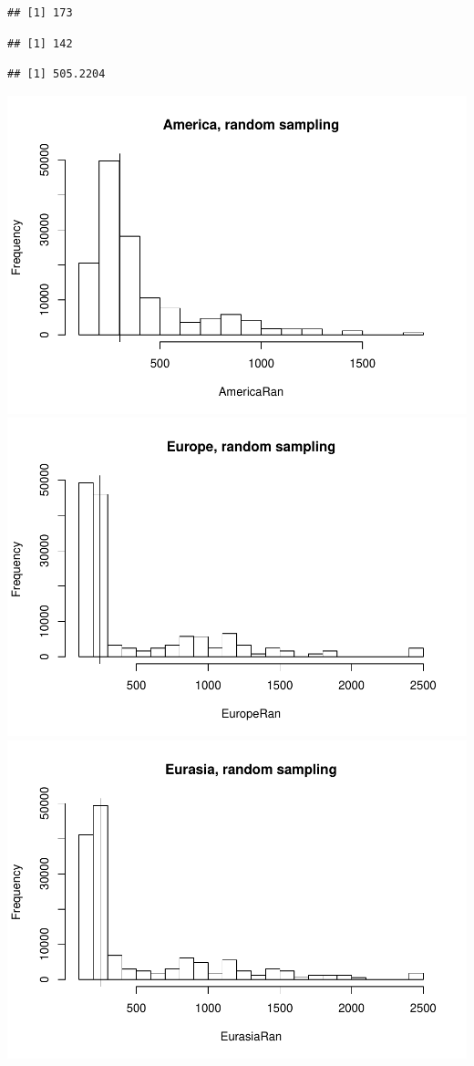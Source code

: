 \documentclass[]{article}
\begin{document}
\begin{verbatim}
## [1] 173
\end{verbatim}

\begin{verbatim}
## [1] 142
\end{verbatim}

\begin{verbatim}
## [1] 505.2204
\end{verbatim}

\includegraphics{MA_JJ_files/figure-latex/RSCon-1.pdf}
\includegraphics{MA_JJ_files/figure-latex/RSCon-2.pdf}
\includegraphics{MA_JJ_files/figure-latex/RSCon-3.pdf}
\end{document}
